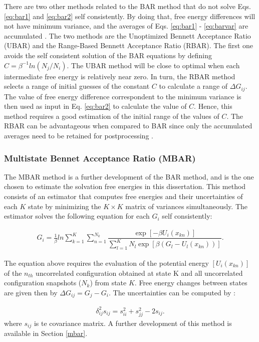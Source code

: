 There are two other methods related to the BAR method that do not solve Eqs. \eqref{eq:bar1} and \eqref{eq:bar2} self consistently. By doing that, free energy differences will not have minimum variance, and the averages of Eqs. \eqref{eq:bar1} - \eqref{eq:barvar} are accumulated \cite{bareva}. The two methods are the Unoptimized Bennett Acceptance Ratio (UBAR) and the Range-Based Bennett Acceptance Ratio (RBAR). The first one avoids the self consistent solution of the BAR equations by defining $C=\beta^{-1}ln(N_{j}/N_{i})$. The UBAR method will be close to optimal when each intermediate free energy is relatively near zero. In turn, the RBAR method selects a range of initial guesses of the constant $C$ to calculate a range of $\Delta G_{ij}$. The value of free energy difference correspondent to the minimum variance is then used as input in Eq. \eqref{eq:bar2} to calculate the value of $C$. Hence, this method requires a good estimation of the initial range of the values of $C$. The RBAR can be advantageous when compared to BAR since only the accumulated averages need to be retained for postprocessing \cite{bareva}.  

\subsubsection{Multistate Bennet Acceptance Ratio (MBAR)}

The MBAR method \cite{mbar} is a further development of the BAR method, and is the one chosen to estimate the solvation free energies in this dissertation. This method consists of an estimator that computes free energies and their uncertainties of each $K$ state by minimizing the $K \times K$ matrix of variances simultaneously. The estimator solves the following equation for each $G_{i}$ self consistently:


\begin{equation}
\label{eq:mbar}
\begin{aligned}
G_{i} = \frac{1}{\beta}ln \sum_{k=1}^{K} \sum_{n=1}^{N_{k}}
\dfrac{\exp[-\beta U_{i}(x_{kn})]}{\sum_{l=1}^{K} N_{l} \exp[\beta (G_{l} - U_{l}(x_{kn}))]} .
\end{aligned}
\end{equation}

The equation above requires the evaluation of the potential energy $[U_{i}(x_{kn})]$ of  the $n_{th}$ uncorrelated configuration obtained at state K and  all uncorrelated configuration snapshots ($N_{k}$) from state $K$. Free energy changes between states are given then by $\Delta G_{ij} = G_{j} -  G_{i}$. The uncertainties  can be computed by :

\begin{equation}
\begin{aligned}
\delta _{ij}^{2} s_{ij} = s_{ii}^{2} + s_{jj}^{2} - 2 s_{ij}.
\end{aligned}
\end{equation}
where $s_{ij}$ is te covariance matrix. A further development of this method is available in Section \ref{mbar}.

